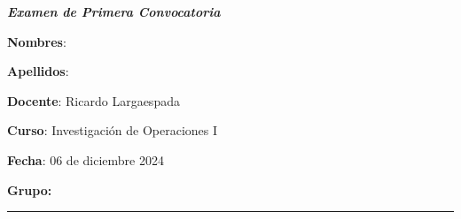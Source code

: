 \documentclass[11pt,paper=a4,answers, addpoints]{exam}
\begin{document}
\noprintanswers
\shorthandoff{<>}
\thispagestyle{empty}
\begin{center}
    \textit{\textbf{Examen de Primera Convocatoria}}
\end{center}
\noindent
\vspace{-.1cm}
\begin{minipage}[t]{.6\textwidth}%
  {\bfseries Nombres}: \makebox[.75\textwidth]{\hrulefill} \par
  {\bfseries Apellidos}: \makebox[.75\textwidth]{\hrulefill} \par
  {\bfseries Docente}: Ricardo Largaespada
\end{minipage}%
\hfill
\begin{minipage}[t]{.4\textwidth}%
  {\bfseries Curso}: Investigación de Operaciones I \par
  {\bfseries Fecha}: 06 de diciembre 2024 \par
  {\bfseries Grupo:} 
  \vspace{1ex}
\end{minipage}    \hfill
  \rule{\textwidth}{1pt}

\end{document}
